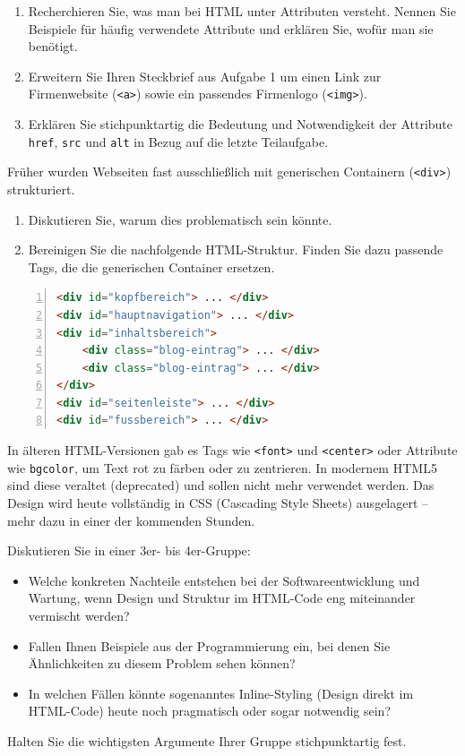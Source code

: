 \documentclass[11pt, a4paper, oneside]{article}
\begin{document}
	
	
	\begin{enumerate}[label=\alph*)]
		\item Recherchieren Sie, was man bei HTML unter Attributen versteht.
		Nennen Sie Beispiele für häufig verwendete Attribute und erklären Sie, wofür man sie benötigt.
		\item Erweitern Sie Ihren Steckbrief aus Aufgabe 1 um einen Link zur Firmenwebsite (\texttt{<a>}) sowie ein passendes Firmenlogo (\texttt{<img>}).
		\item Erklären Sie stichpunktartig die Bedeutung und Notwendigkeit der Attribute \texttt{href}, \texttt{src} und \texttt{alt} in Bezug auf die letzte Teilaufgabe.
	\end{enumerate}
	\lines[5cm]
	
	
	
	Früher wurden Webseiten fast ausschließlich mit generischen Containern (\texttt{<div>}) strukturiert.
	
	\begin{enumerate}[label=\alph*)]
		\item Diskutieren Sie, warum dies problematisch sein könnte.
		\item Bereinigen Sie die nachfolgende HTML-Struktur.
		Finden Sie dazu passende Tags, die die generischen Container ersetzen.
	\end{enumerate}
	
	\begin{lstlisting}[language=HTML, numbers=left, frame=single]
<div id="kopfbereich"> ... </div>
<div id="hauptnavigation"> ... </div>
<div id="inhaltsbereich">
	<div class="blog-eintrag"> ... </div>
	<div class="blog-eintrag"> ... </div>
</div>
<div id="seitenleiste"> ... </div>
<div id="fussbereich"> ... </div>
	\end{lstlisting}
	
	\pagebreak
	
	
	In älteren HTML-Versionen gab es Tags wie \texttt{<font>} und \texttt{<center>} oder Attribute wie \texttt{bgcolor}, um Text rot zu färben oder zu zentrieren.
	In modernem HTML5 sind diese veraltet (deprecated) und sollen nicht mehr verwendet werden.
	Das Design wird heute vollständig in CSS (Cascading Style Sheets) ausgelagert -- mehr dazu in einer der kommenden Stunden.
	
	Diskutieren Sie in einer 3er- bis 4er-Gruppe:
	\begin{itemize}
		\item Welche konkreten Nachteile entstehen bei der Softwareentwicklung und Wartung, wenn Design und Struktur im HTML-Code eng miteinander vermischt werden?
		\item Fallen Ihnen Beispiele aus der Programmierung ein, bei denen Sie Ähnlichkeiten zu diesem Problem sehen können?
		\item In welchen Fällen könnte sogenanntes Inline-Styling (Design direkt im HTML-Code) heute noch pragmatisch oder sogar notwendig sein?
	\end{itemize}
	Halten Sie die wichtigsten Argumente Ihrer Gruppe stichpunktartig fest.
	
\end{document}
